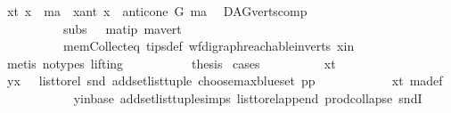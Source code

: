 \begin{isabellebody}
\ {\isacharparenleft}{\kern0pt}x{\isacharunderscore}{\kern0pt}t{\isacharparenright}{\kern0pt}\ {\isachardoublequoteopen}x\ {\isacharequal}{\kern0pt}\ ma{\isachardoublequoteclose}\ {\isacharbar}{\kern0pt}\ {\isacharparenleft}{\kern0pt}x{\isacharunderscore}{\kern0pt}ant{\isacharparenright}{\kern0pt}\ {\isachardoublequoteopen}x\ {\isasymin}\ anticone\ G\ ma{\isachardoublequoteclose}\ \isamarkupfalse%
\ DAG{\isachardot}{\kern0pt}verts{\isacharunderscore}{\kern0pt}comp{}\ \isanewline
\ \ \ \ \ \ \ \ \ \ subs\ {}\ \ ma{\isacharunderscore}{\kern0pt}tip\ ma{\isacharunderscore}{\kern0pt}vert\ \isanewline
\ \ \ \ \ \ \ \ \ \ mem{\isacharunderscore}{\kern0pt}Collect{\isacharunderscore}{\kern0pt}eq\ tips{\isacharunderscore}{\kern0pt}def\ wf{\isacharunderscore}{\kern0pt}digraph{\isachardot}{\kern0pt}reachable{}{\isacharunderscore}{\kern0pt}in{\isacharunderscore}{\kern0pt}verts{\isacharparenleft}{\kern0pt}{}{\isacharparenright}{\kern0pt}\ x{\isacharunderscore}{\kern0pt}in\isanewline
\ \ \ \ \ \ \ \ \isamarkupfalse%
\ {\isacharparenleft}{\kern0pt}metis\ {\isacharparenleft}{\kern0pt}no{\isacharunderscore}{\kern0pt}types{\isacharcomma}{\kern0pt}\ lifting{\isacharparenright}{\kern0pt}{\isacharparenright}{\kern0pt}\ \isanewline
\ \ \ \ \ \ \isamarkupfalse%
\ \isamarkupfalse%
\ {\isacharquery}{\kern0pt}thesis\ \isamarkupfalse%
{\isacharparenleft}{\kern0pt}cases{\isacharparenright}{\kern0pt}\isanewline
\ \ \ \ \ \ \ \ \isamarkupfalse%
\ x{\isacharunderscore}{\kern0pt}t\isanewline
\ \ \ \ \ \ \ \ \isamarkupfalse%
\ \isamarkupfalse%
\ {\isachardoublequoteopen}{\isacharparenleft}{\kern0pt}y{\isacharcomma}{\kern0pt}x{\isacharparenright}{\kern0pt}\ {\isasymin}\ \ list{\isacharunderscore}{\kern0pt}to{\isacharunderscore}{\kern0pt}rel\ {\isacharparenleft}{\kern0pt}snd\ {\isacharparenleft}{\kern0pt}add{\isacharunderscore}{\kern0pt}set{\isacharunderscore}{\kern0pt}list{\isacharunderscore}{\kern0pt}tuple\ {\isacharparenleft}{\kern0pt}choose{\isacharunderscore}{\kern0pt}max{\isacharunderscore}{\kern0pt}blue{\isacharunderscore}{\kern0pt}set\ pp{\isacharparenright}{\kern0pt}{\isacharparenright}{\kern0pt}{\isacharparenright}{\kern0pt}{\isachardoublequoteclose}\isanewline
\ \ \ \ \ \ \ \ \ \ \isamarkupfalse%
\ x{\isacharunderscore}{\kern0pt}t\ ma{\isacharunderscore}{\kern0pt}def\ \isanewline
\ \ \ \ \ \ \ \ \ \ \isamarkupfalse%
\ y{\isacharunderscore}{\kern0pt}in{\isacharunderscore}{\kern0pt}base\ add{\isacharunderscore}{\kern0pt}set{\isacharunderscore}{\kern0pt}list{\isacharunderscore}{\kern0pt}tuple{\isachardot}{\kern0pt}simps\ list{\isacharunderscore}{\kern0pt}to{\isacharunderscore}{\kern0pt}rel{\isacharunderscore}{\kern0pt}append\ prod{\isachardot}{\kern0pt}collapse\ sndI\isanewline

\end{isabellebody}
